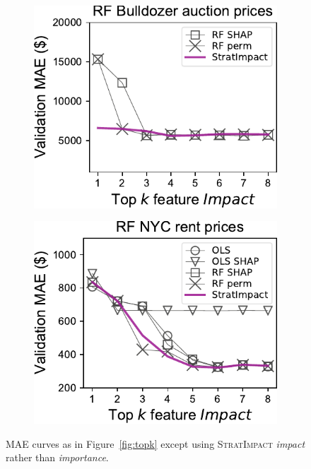 \documentclass[11pt]{article}
\newcommand{\figref}[1]{Figure~\ref{#1}}
\newcommand{\todo}[1]{{{\small\color{red}{[#1]}}}}
\newcommand{\simp}{\fontfamily{cmr}\textsc{\small StratImpact}}
\begin{document}
{\begin{figure}
\begin{subfigure}{.245\textwidth}
\includegraphics[scale=0.45]{images/bulldozer-topk-RF-Impact.pdf}
\subcaption{}
\end{subfigure}%
\hfill
\begin{subfigure}{.245\textwidth}
    \centering
\includegraphics[scale=0.45]{images/rent-topk-RF-Impact.pdf}
\subcaption{}
\end{subfigure}
\caption[short]{\small MAE curves as in \figref{fig:topk} except using \simp{} {\em impact} rather than {\em importance}. \todo{merge with previous importance graphs?}}
\label{fig:topk-impact}
\end{figure}
}
\end{document}
